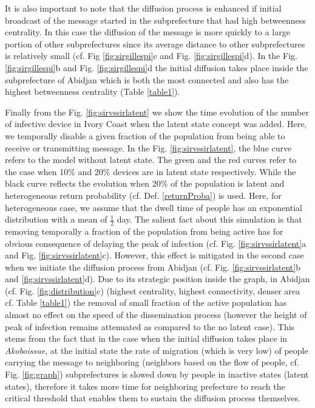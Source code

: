 \documentclass[review]{elsarticle}
\begin{document}
It is also important to note that the diffusion process is enhanced if initial broadcast of the message started in the subprefecture that had high betweenness centrality. In this case the diffusion of the message is more quickly to a large portion of other subprefectures since its average distance to other subprefectures is relatively small (cf. Fig \ref{fig:sirgillespi}c and Fig. \ref{fig:sirgillespi}d). In the Fig. \ref{fig:sirgillespi}b and Fig. \ref{fig:sirgillespi}d the initial diffusion takes place inside the subprefecture of Abidjan which is both the most connected and also has the highest betweenness centrality (Table \ref{table1}).  

Finally from the Fig. \ref{fig:sirvssirlatent} we show the time evolution of the number of infective device in Ivory Coast when the latent state concept was added. Here, we temporally disable a given fraction of the population from being able to receive or transmitting message. In the Fig. \ref{fig:sirvssirlatent}, the blue curve refers to the model without latent state. The green and the red curves refer to the case when 10\% and 20\% devices are in latent state respectively. While the black curve reflects the evolution when 20\% of the population is latent and heterogeneous return probability (cf. Def. \ref{returnProba}) is used. Here, for heterogeneous case, we assume that the dwell time of people has an exponential distribution with a mean of $\frac{1}{2}$ day. The salient fact about this simulation is that removing temporally a fraction of the population from being active has for obvious consequence of delaying the peak of infection (cf. Fig. \ref{fig:sirvssirlatent}a and Fig. \ref{fig:sirvssirlatent}c). However, this effect is mitigated in the second case when we initiate the diffusion process from Abidjan (cf. Fig. \ref{fig:sirvssirlatent}b and \ref{fig:sirvssirlatent}d). Due to its strategic position inside the graph, in Abidjan (cf. Fig. \ref{fig:distribution}c) (highest centrality, highest connectivity, denser area cf. Table \ref{table1}) the removal of small fraction of the active population has almost no effect on the speed of the dissemination process (however the height of peak of infection remains attenuated as compared to the no latent case). This stems from the fact that in the case when the initial diffusion takes place in \textit{Akoboissue}, at the initial state the rate of migration (which is very low) of people carrying the message to neighboring (neighbors based on the flow of people, cf. Fig. \ref{fig:graph}) subprefectures is slowed down by people in inactive states (latent states), therefore it takes more time for neighboring prefecture to reach the critical threshold that enables them to sustain the diffusion process themselves.
\end{document}
